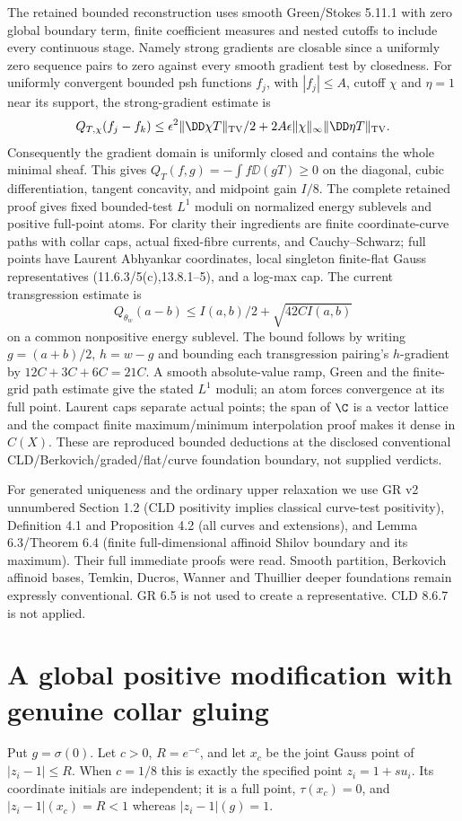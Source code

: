 The retained bounded reconstruction uses smooth Green/Stokes 5.11.1
with zero global boundary term, finite coefficient measures and nested
cutoffs to include every continuous stage. Namely strong gradients
are closable since a uniformly zero sequence pairs to zero against every
smooth gradient test by closedness. For uniformly convergent bounded
psh functions $f_j$, with $|f_j|\le A$, cutoff $\chi$ and $\eta=1$
near its support, the strong-gradient estimate is
\[
 Q_{T,\chi}(f_j-f_k)\le \epsilon^2\|\DD\chi T\|_{\rm TV}/2
 +2A\epsilon\|\chi\|_\infty\|\DD\eta T\|_{\rm TV}.
\]
Consequently the gradient domain is uniformly closed and contains the
whole minimal sheaf. This gives $Q_T(f,g)=-\int f\DD(gT)\ge0$
on the diagonal, cubic differentiation, tangent concavity, and midpoint
gain $I/8$. The complete retained proof gives fixed bounded-test $L^1$
moduli on normalized energy sublevels and positive full-point atoms.
For clarity their ingredients are finite coordinate-curve paths with
collar caps, actual fixed-fibre currents, and Cauchy--Schwarz; full
points have Laurent Abhyankar coordinates, local singleton finite-flat
Gauss representatives (11.6.3/5(c),13.8.1--5), and a log-max cap.
The current transgression estimate is
\[
 Q_{\theta_w}(a-b)\le I(a,b)/2+\sqrt{42C I(a,b)}
\]
on a common nonpositive energy sublevel. The bound follows by writing
$g=(a+b)/2$, $h=w-g$ and bounding each transgression pairing's
$h$-gradient by $12C+3C+6C=21C$. A smooth absolute-value ramp,
Green and the finite-grid path estimate give the stated $L^1$ moduli;
an atom forces convergence at its full point. Laurent caps separate
actual points; the span of $\C$ is a vector lattice and the compact
finite maximum/minimum interpolation proof makes it dense in $C(X)$.
These are reproduced bounded deductions at the disclosed conventional
CLD/Berkovich/graded/flat/curve foundation boundary, not supplied verdicts.

For generated uniqueness and the ordinary upper relaxation we use GR v2
unnumbered Section 1.2 (CLD positivity implies classical curve-test
positivity), Definition 4.1 and Proposition 4.2 (all curves and extensions),
and Lemma 6.3/Theorem 6.4 (finite full-dimensional affinoid Shilov boundary
and its maximum). Their full immediate proofs were read. Smooth partition,
Berkovich affinoid bases, Temkin, Ducros, Wanner and Thuillier deeper
foundations remain expressly conventional. GR 6.5 is not used to create
a representative. CLD 8.6.7 is not applied.

\section{A global positive modification with genuine collar gluing}
Put $g=\sigma(0)$. Let $c>0$, $R=e^{-c}$, and let $x_c$ be the
joint Gauss point of $|z_i-1|\le R$. When $c=1/8$ this is exactly
the specified point $z_i=1+s u_i$. Its coordinate initials are independent;
it is a full point, $\tau(x_c)=0$, and $|z_i-1|(x_c)=R<1$
whereas $|z_i-1|(g)=1$.


